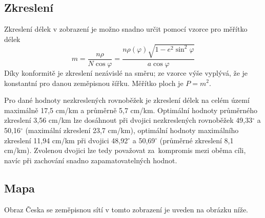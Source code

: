 \documentclass[a4paper]{article}
\newcommand{\dg}{^{\circ}}
\begin{document}
\subsection{Zkreslení}
Zkreslení délek v zobrazení je možno snadno určit pomocí vzorce pro měřítko délek
\begin{equation*}
m = \frac{n\rho}{N \cos{\varphi}} = \frac{n\rho(\varphi) \sqrt{1 - e^2 \sin^2{\varphi}}}{a \cos{\varphi}}
\end{equation*}
Díky konformitě je zkreslení nezávislé na směru; ze vzorce výše vyplývá, že je konstantní pro danou zeměpisnou šířku. Měřítko ploch je $P = m^2$.

Pro dané hodnoty nezkreslených rovnoběžek je zkreslení délek na celém území maximálně 17,5 cm/km a průměrně 5,7 cm/km. Optimální hodnoty průměrného zkreslení 3,56 cm/km lze dosáhnout při dvojici nezkreslených rovnoběžek 49,33$\dg$ a 50,16$\dg$ (maximální zkreslení 23,7 cm/km), optimální hodnoty maximálního zkreslení 11,94 cm/km při dvojici 48,92$\dg$ a 50,69$\dg$ (průměrné zkreslení 8,1 cm/km). Zvolenou dvojici lze tedy považovat za~kompromis mezi oběma cíli, navíc při zachování snadno zapamatovatelných hodnot.

\subsection{Mapa}
Obraz Česka se zeměpisnou sítí v tomto zobrazení je uveden na obrázku níže.


\end{document}
